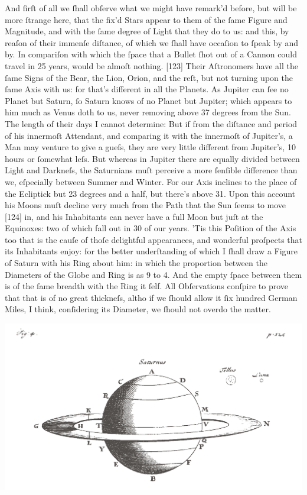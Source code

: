 \documentclass[letterpaper]{book}
\begin{document}
And firſt of all we ſhall obſerve what we might have remark'd before, but
will be more ſtrange here, that the fix'd Stars appear to them of the ſame
Figure and Magnitude, and with the ſame degree of Light that they do to us:
and this, by reaſon of their immenſe diſtance, of which we ſhall have
occaſion to ſpeak by and by. In compariſon with which the ſpace that a
Bullet ſhot out of a Cannon could travel in 25 years, would be almoſt
nothing.  [123] Their Aſtronomers have all the ſame Signs of the Bear, the
Lion, Orion, and the reſt, but not turning upon the ſame Axis with us: for
that's different in all the Planets.  As Jupiter can ſee no Planet but
Saturn, ſo Saturn knows of no Planet but Jupiter; which appears to him much
as Venus doth to us, never removing above 37 degrees from the Sun. The
length of their days I cannot determine: But if from the diſtance and period
of his innermoſt Attendant, and comparing it with the innermoſt of
Jupiter's, a Man may venture to give a gueſs, they are very little different
from Jupiter's, 10 hours or ſomewhat leſs. But whereas in Jupiter there are
equally divided between Light and Darkneſs, the Saturnians muſt perceive a
more ſenſible difference than we, eſpecially between Summer and Winter. For
our Axis inclines to the place of the Ecliptick but 23 degrees and a half,
but there's above 31. Upon this account his Moons muſt decline very much
from the Path that the Sun ſeems to move [124] in, and his Inhabitants can
never have a full Moon but juſt at the Equinoxes: two of which fall out in
30 of our years. 'Tis this Poſition of the Axis too that is the cauſe of
thoſe delightful appearances, and wonderful proſpects that its Inhabitants
enjoy: for the better underſtanding of which I ſhall draw a Figure of Saturn
with his Ring about him: in which the proportion between the Diameters of
the Globe and Ring is as 9 to 4.  And the empty ſpace between them is of the
ſame breadth with the Ring it ſelf. All Obſervations conſpire to prove that
that is of no great thickneſs, altho if we ſhould allow it ſix hundred
German Miles, I think, conſidering its Diameter, we ſhould not overdo the
matter.  

\begin{center}
	\includegraphics[width=.90\textwidth]{Images/ct_4_en.jpg}
\end{center}
\end{document}
